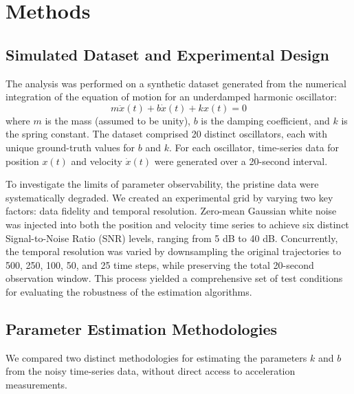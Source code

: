 \documentclass[]{article}
\begin{document}
\section{Methods}
\label{sec:methods}
\subsection{Simulated Dataset and Experimental Design}
The analysis was performed on a synthetic dataset generated from the numerical integration of the equation of motion for an underdamped harmonic oscillator:
\begin{equation}
m\ddot{x}(t) + b\dot{x}(t) + kx(t) = 0
\end{equation}
where $m$ is the mass (assumed to be unity), $b$ is the damping coefficient, and $k$ is the spring constant. The dataset comprised 20 distinct oscillators, each with unique ground-truth values for $b$ and $k$. For each oscillator, time-series data for position $x(t)$ and velocity $\dot{x}(t)$ were generated over a 20-second interval.

To investigate the limits of parameter observability, the pristine data were systematically degraded. We created an experimental grid by varying two key factors: data fidelity and temporal resolution. Zero-mean Gaussian white noise was injected into both the position and velocity time series to achieve six distinct Signal-to-Noise Ratio (SNR) levels, ranging from 5 dB to 40 dB. Concurrently, the temporal resolution was varied by downsampling the original trajectories to 500, 250, 100, 50, and 25 time steps, while preserving the total 20-second observation window. This process yielded a comprehensive set of test conditions for evaluating the robustness of the estimation algorithms.

\subsection{Parameter Estimation Methodologies}
We compared two distinct methodologies for estimating the parameters $k$ and $b$ from the noisy time-series data, without direct access to acceleration measurements.
\end{document}
